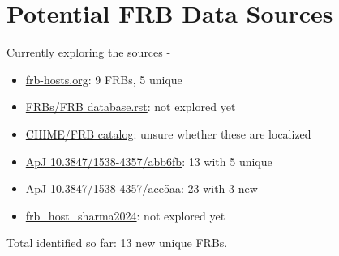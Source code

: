 \documentclass{article}
\begin{document}
\clearpage

\section{Potential FRB Data Sources}
Currently exploring the sources -

\begin{itemize}
    \item \href{https://www.frb-hosts.org/}{frb-hosts.org}: 9 FRBs, 5 unique
    \item \href{https://github.com/FRBs/FRB/blob/main/docs/database.rst}{FRBs/FRB database.rst}: not explored yet
    \item \href{https://www.chime-frb.ca/catalog}{CHIME/FRB catalog}: unsure whether these are localized
    \item \href{https://iopscience.iop.org/article/10.3847/1538-4357/abb6fb/pdf}{ApJ 10.3847/1538-4357/abb6fb}: 13 with 5 unique
    \item \href{https://iopscience.iop.org/article/10.3847/1538-4357/ace5aa/pdf}{ApJ 10.3847/1538-4357/ace5aa}: 23 with 3 new
    \item \href{https://github.com/krittisharma/frb_host_sharma2024}{frb\_host\_sharma2024}: not explored yet
\end{itemize}

\noindent Total identified so far: 13 new unique FRBs.
\end{document}
